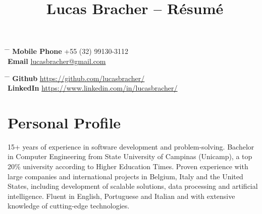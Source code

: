 \documentclass[10pt]{article} %
\begin{document}

\title{Lucas Bracher -- Résumé} %


\parbox{0.5\textwidth}{ %
\begin{tabbing} %
\hspace{3cm} \= \hspace{4cm} \= \kill %
{\bf Mobile Phone} \> +55 (32) 99130-3112 \\ %
{\bf Email} \> \href{mailto:lucasbracher@gmail.com}{lucasbracher@gmail.com} \\ %
\end{tabbing}}
\hfill %
\parbox{0.5\textwidth}{ %
\begin{tabbing} %
\hspace{3cm} \= \hspace{4cm} \= \kill %
{\bf Github} \> \href{https://github.com/lucasbracher/}{https://github.com/lucasbracher/} \\ %
{\bf LinkedIn} \> \href{https://www.linkedin.com/in/lucasbracher/}{https://www.linkedin.com/in/lucasbracher/} \\ %
\end{tabbing}}


\section{Personal Profile}

15+ years of experience in software development and problem-solving. Bachelor in Computer Engineering from State University of Campinas (Unicamp), a top 20\% university according to Higher Education Times. Proven experience with large companies and international projects in Belgium, Italy and the United States, including development of scalable solutions, data processing and artificial intelligence. Fluent in English, Portuguese and Italian and with extensive knowledge of cutting-edge technologies.
\end{document}
